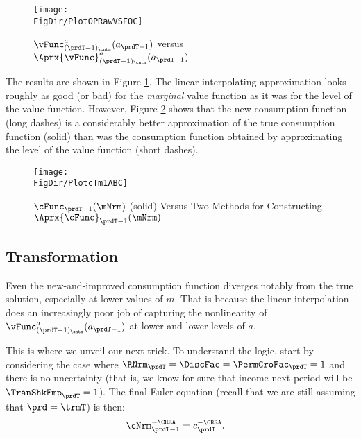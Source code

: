 \documentclass[\econtexRoot/SolvingMicroDSOPs]{subfiles}
\begin{document}
\hypertarget{PlotOPRawVSFOC}{}
\begin{figure}
  \centerline{\texttt{[image: \\FigDir/PlotOPRawVSFOC]}}
  \caption{$\vFunc_{(\prdT-1)_\cntn}^{a}(a_{\prdT-1})$ versus $\Aprx{\vFunc}_{(\prdT-1)_\cntn}^{a}(a_{\prdT-1})$}
  \label{fig:PlotOPRawVSFOC}
\end{figure}


The results are shown in Figure \ref{fig:PlotOPRawVSFOC}.  The linear interpolating approximation looks roughly as good (or bad) for the \textit{marginal} value function as it was for the level of the value function. However, Figure \ref{fig:PlotcTm1ABC} shows that the new consumption function (long dashes) is a considerably better approximation of the true consumption function (solid) than was the consumption function obtained by approximating the level of the value function (short dashes).

\hypertarget{PlotcTm1ABC}{}
\begin{figure}
  \centerline{\texttt{[image: \\FigDir/PlotcTm1ABC]}}
  \caption{$\cFunc_{\prdT-1}(\mNrm)$ (solid) Versus Two Methods for Constructing $\Aprx{\cFunc}_{\prdT-1}(\mNrm)$}
  \label{fig:PlotcTm1ABC}
\end{figure}

\hypertarget{transformation}{}
\subsection{Transformation}\label{subsec:transformation}

Even the new-and-improved consumption function diverges notably from the true
solution, especially at lower values of $m$.  That is because the
linear interpolation does an increasingly poor job of capturing the
nonlinearity of $\vFunc_{(\prdT-1)_\cntn}^{a}(a_{\prdT-1})$ at
lower and lower levels of $a$.

This is where we unveil our next trick.  To understand the logic,
start by considering the case where $\RNrm_{\prdT} = \DiscFac =
\PermGroFac_{\prdT} = 1$ and there is no uncertainty
(that is, we know for sure that income next period
will be $\TranShkEmp_{\prdT} = 1$).  The final Euler equation (recall that we are still assuming that $\prd=\trmT$) is then:
\begin{equation}\begin{gathered}\begin{aligned}
      \cNrm_{\prdT-1}^{-\CRRA}  & = c_{\prdT}^{-\CRRA}.
    \end{aligned}\end{gathered}\end{equation}
\end{document}
